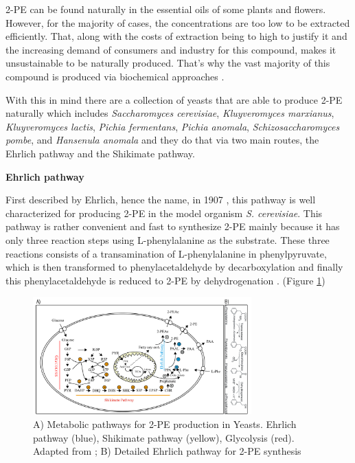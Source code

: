 \documentclass[runningheads]{llncs}
\begin{document}
2-PE can be found naturally in the essential oils of some plants and flowers. However, for the majority of cases, the concentrations are too low to be extracted efficiently. That, along with the costs of extraction being to high to justify it and the increasing demand of consumers and industry for this compound, makes it unsustainable to be naturally produced. That's why the vast majority of this compound is produced via biochemical approaches \cite{etschmann2002biotechnological}.

With this in mind there are a collection of yeasts that are able to produce 2-PE naturally which includes \emph{Saccharomyces cerevisiae}, \emph{Kluyveromyces
marxianus}, \emph{Kluyveromyces lactis}, \emph{Pichia fermentans}, \emph{Pichia anomala},
\emph{Schizosaccharomyces pombe}, and \emph{Hansenula anomala} \cite{etschmann2003screening} and they do that via two main routes, the Ehrlich pathway and the Shikimate pathway.

\textbf{Ehrlich pathway}

First described by Ehrlich, hence the name, in 1907 \cite{EhrlichberDB}, this pathway is well characterized for producing 2-PE in the model organism \emph{S. cerevisiae}.
This pathway is rather convenient and fast to synthesize 2-PE mainly because it has only three reaction steps using L-phenylalanine as the substrate. These three reactions consists of a transamination of L-phenylalanine in phenylpyruvate, which is then transformed to phenylacetaldehyde by decarboxylation and finally this phenylacetaldehyde is reduced to 2-PE by dehydrogenation \cite{hazelwood2008ehrlich}. (Figure \ref{fig:metabolicpathways})

\begin{figure}[H]
    \centering
    \includegraphics[width=0.75\textwidth]{imagens/DETAILED_PATHWAY.png}
    \caption{A) Metabolic pathways for 2-PE production in Yeasts. Ehrlich pathway (blue), Shikimate pathway (yellow), Glycolysis (red). Adapted from \cite{wang2019advances}; B) Detailed Ehrlich pathway for 2-PE synthesis \cite{etschmann2002biotechnological}}
    \label{fig:metabolicpathways}
\end{figure}
\end{document}
